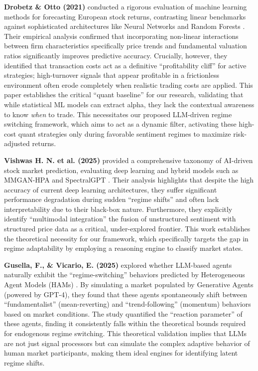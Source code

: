 \documentclass[12pt, a4paper]{report}
\begin{document}
\textbf{Drobetz \& Otto (2021)} conducted a rigorous evaluation of machine learning methods for forecasting European stock returns, contrasting linear benchmarks against sophisticated architectures like Neural Networks and Random Forests \cite{drobetz2021}. Their empirical analysis confirmed that incorporating non-linear interactions between firm characteristics specifically price trends and fundamental valuation ratios significantly improves predictive accuracy. Crucially, however, they identified that transaction costs act as a definitive ``profitability cliff'' for active strategies; high-turnover signals that appear profitable in a frictionless environment often erode completely when realistic trading costs are applied. This paper establishes the critical ``quant baseline'' for our research, validating that while statistical ML models can extract alpha, they lack the contextual awareness to know \textit{when} to trade. This necessitates our proposed LLM-driven regime switching framework, which aims to act as a dynamic filter, activating these high-cost quant strategies only during favorable sentiment regimes to maximize risk-adjusted returns.

\textbf{Vishwas H. N. et al. (2025)} provided a comprehensive taxonomy of AI-driven stock market prediction, evaluating deep learning and hybrid models such as MMGAN-HPA and SpectralGPT \cite{vishwas2025}. Their analysis highlights that despite the high accuracy of current deep learning architectures, they suffer significant performance degradation during sudden ``regime shifts'' and often lack interpretability due to their black-box nature. Furthermore, they explicitly identify ``multimodal integration'' the fusion of unstructured sentiment with structured price data as a critical, under-explored frontier. This work establishes the theoretical necessity for our framework, which specifically targets the gap in regime adaptability by employing a reasoning engine to classify market states.

\textbf{Gusella, F., \& Vicario, E. (2025)} explored whether LLM-based agents naturally exhibit the ``regime-switching'' behaviors predicted by Heterogeneous Agent Models (HAMs) \cite{gusella2025}. By simulating a market populated by Generative Agents (powered by GPT-4), they found that these agents spontaneously shift between ``fundamentalist'' (mean-reverting) and ``trend-following'' (momentum) behaviors based on market conditions. The study quantified the ``reaction parameter'' of these agents, finding it consistently falls within the theoretical bounds required for endogenous regime switching. This theoretical validation implies that LLMs are not just signal processors but can simulate the complex adaptive behavior of human market participants, making them ideal engines for identifying latent regime shifts.
\end{document}
